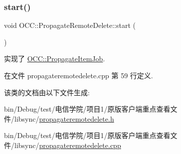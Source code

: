 \subsubsection{\texorpdfstring{start()}{start()}}
{\footnotesize\ttfamily void O\+C\+C\+::\+Propagate\+Remote\+Delete\+::start (\begin{DoxyParamCaption}{ }\end{DoxyParamCaption})\hspace{0.3cm}{\ttfamily [virtual]}}



实现了 \hyperlink{class_o_c_c_1_1_propagate_item_job_a97e7a37e51ad1696f6590dd52080f10a}{O\+C\+C\+::\+Propagate\+Item\+Job}.



在文件 propagateremotedelete.\+cpp 第 59 行定义.



该类的文档由以下文件生成\+:\begin{DoxyCompactItemize}
\item 
bin/\+Debug/test/电信学院/项目1/原版客户端重点查看文件/libsync/\hyperlink{propagateremotedelete_8h}{propagateremotedelete.\+h}\item 
bin/\+Debug/test/电信学院/项目1/原版客户端重点查看文件/libsync/\hyperlink{propagateremotedelete_8cpp}{propagateremotedelete.\+cpp}\end{DoxyCompactItemize}
